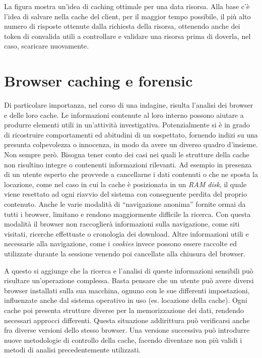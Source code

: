 La figura mostra un'idea di caching ottimale per una data risorsa. Alla base c'è l'idea di salvare nella cache del client, per il maggior tempo possibile, il più alto numero di risposte ottenute dalla richiesta della risorsa, ottenendo anche dei token di convalida utili a controllare e validare una risorsa prima di doverla, nel caso, scaricare nuovamente.

\section {Browser caching e forensic}

Di particolare importanza, nel corso di una indagine, risulta l'analisi dei browser e delle loro cache. Le informazioni contenute al loro interno possono aiutare a produrre elementi utili in un'attività investigativa. 
Potenzialmente si è in grado di ricostruire comportamenti ed abitudini di un sospettato, fornendo indizi su una presunta colpevolezza o innocenza, in modo da avere un diverso quadro d'insieme. Non sempre però. Bisogna tener conto dei casi nei quali le strutture della cache non risultino integre o contenenti informazioni rilevanti. Ad esempio in presenza di un utente esperto che provvede a cancellarne i dati contenuti o che ne sposta la locazione, come nel caso in cui la cache è posizionata in un \textit{RAM disk}, il quale viene resettato ad ogni riavvio del sistema con conseguente perdita del proprio contenuto. Anche le varie modalità di ``navigazione anonima'' fornite ormai da tutti i browser, limitano e rendono maggiormente difficile la ricerca. Con questa modalità il browser non raccoglierà informazioni sulla navigazione, come siti visitati, ricerche effettuate o cronologia dei download. Altre informazioni utili e necessarie alla navigazione, come i \textit{cookies} invece possono essere raccolte ed utilizzate durante la sessione venendo poi cancellate alla chiusura del browser.

A questo si aggiunge che la ricerca e l'analisi di queste informazioni sensibili può risultare un'operazione complessa. Basta pensare che un utente può avere diversi browser installati sulla sua macchina, ognuno con le sue differenti impostazioni, influenzate anche dal sistema operativo in uso (es. locazione della cache). Ogni cache poi presenta strutture diverse per la memorizzazione dei dati, rendendo necessari approcci differenti. Questa situazione addirittura può verificarsi anche fra diverse versioni dello stesso browser. Una versione successiva può introdurre nuove metodologie di controllo della cache, facendo diventare non più validi i metodi di analisi precedentemente utilizzati.




